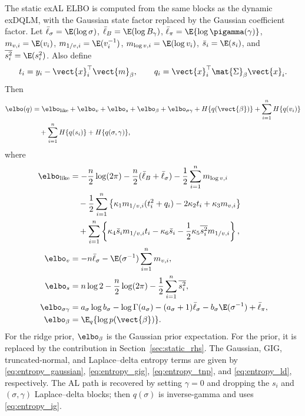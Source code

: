The static exAL ELBO is computed from the same blocks as the dynamic exDQLM,
with the Gaussian state factor replaced by the Gaussian coefficient factor.
Let
$\bar\ell_\sigma=\E(\log\sigma)$,
$\bar\ell_B=\E(\log B_\gamma)$,
$\bar\ell_\pi=\E\{\log\pigamma(\gamma)\}$,
$m_{v,i}=\E(v_i)$, $m_{1/v,i}=\E(v_i^{-1})$,
$m_{\log v,i}=\E(\log v_i)$, $\bar s_i=\E(s_i)$, and
$\overline{s_i^2}=\E(s_i^2)$. Also define
\begin{equation}
t_i=y_i-\vect{x}_i^\top\vect{m}_\beta,\qquad
q_i=\vect{x}_i^\top\mat{\Sigma}_\beta\vect{x}_i.
\end{equation}
Then
\begin{align}
\elbo(q)
&=
\elbo_{\mathrm{like}}+\elbo_v+\elbo_s+\elbo_\beta
+\elbo_{\sigma\gamma}
+H\{q(\vect{\beta})\}
+\sum_{i=1}^nH\{q(v_i)\}\nonumber\\
&\quad
+\sum_{i=1}^nH\{q(s_i)\}
+H\{q(\sigma,\gamma)\},
\label{eq:static_exal_elbo}
\end{align}
where
\begin{align}
\elbo_{\mathrm{like}}
&=
-\frac{n}{2}\log(2\pi)
-\frac{n}{2}(\bar\ell_B+\bar\ell_\sigma)
-\frac{1}{2}\sum_{i=1}^nm_{\log v,i}\nonumber\\
&\quad
-\frac{1}{2}\sum_{i=1}^n
\left\{
\kappa_1m_{1/v,i}(t_i^2+q_i)
-2\kappa_2t_i+\kappa_3m_{v,i}
\right\}\nonumber\\
&\quad
+\sum_{i=1}^n
\left\{
\kappa_4\bar s_i m_{1/v,i}t_i
-\kappa_6\bar s_i
-\frac{1}{2}\kappa_5\overline{s_i^2}m_{1/v,i}
\right\},\\
\elbo_v
&=
-n\bar\ell_\sigma-\E(\sigma^{-1})\sum_{i=1}^nm_{v,i},\\
\elbo_s
&=
n\log 2-\frac{n}{2}\log(2\pi)
-\frac{1}{2}\sum_{i=1}^n\overline{s_i^2},\\
\elbo_{\sigma\gamma}
&=
a_\sigma\log b_\sigma-\log\Gamma(a_\sigma)
-(a_\sigma+1)\bar\ell_\sigma
-b_\sigma\E(\sigma^{-1})
+\bar\ell_\pi,\\
\elbo_\beta
&=\E_q\{\log p(\vect{\beta})\}.
\label{eq:static_exal_elbo_terms}
\end{align}
For the ridge prior, $\elbo_\beta$ is the Gaussian prior expectation. For the
 prior, it is replaced by the  contribution in
Section~\ref{sec:static_rhs}. The Gaussian, GIG, truncated-normal, and
Laplace--delta entropy terms are given by
\eqref{eq:entropy_gaussian}, \eqref{eq:entropy_gig},
\eqref{eq:entropy_tnp}, and \eqref{eq:entropy_ld}, respectively. The AL path
is recovered by setting $\gamma=0$ and dropping the $s_i$ and
$(\sigma,\gamma)$ Laplace--delta blocks; then $q(\sigma)$ is inverse-gamma and
uses \eqref{eq:entropy_ig}.

